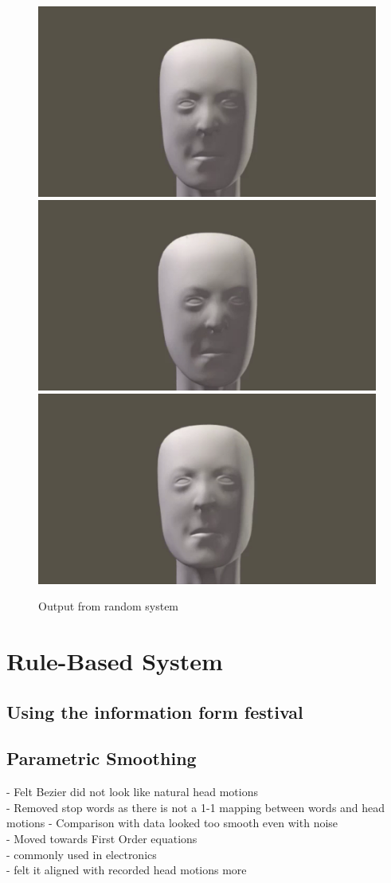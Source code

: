 \documentclass[bsc,frontabs,twoside,singlespacing,parskip]{infthesis}
\begin{document}
\begin{figure}
	\centering
	\includegraphics[width=.5\textwidth]{fightclub1.png}
	\includegraphics[width=.5\textwidth]{fightclub3.png}
	\includegraphics[width=.5\textwidth]{fightclub4.png}
	\caption{Output from random system}
\end{figure}

\section{Rule-Based System}

\subsection{Using the information form festival}

\subsection{Parametric Smoothing}
- Felt Bezier did not look like natural head motions \\
- Removed stop words as there is not a 1-1 mapping between words and head motions
- Comparison with data looked too smooth even with noise \\
- Moved towards First Order equations \\
- commonly used in electronics \\
- felt it aligned with recorded head motions more\\
	
\end{document}
